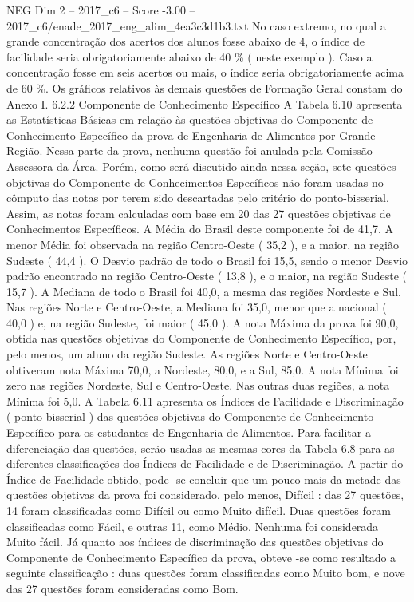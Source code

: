 \begin{textsample}{NEG Dim 2 – 2017\_c6 – Score -3.00 – 2017\_c6/enade\_2017\_eng\_alim\_4ea3c3d1b3.txt}
No caso extremo, no qual a grande concentração dos acertos dos alunos fosse abaixo de 4, o índice de facilidade seria obrigatoriamente abaixo de 40 \% ( neste exemplo ).
Caso a concentração fosse em seis acertos ou mais, o índice seria obrigatoriamente acima de 60 \%.
Os gráficos relativos às demais questões de Formação Geral constam do Anexo I. 6.2.2 Componente de Conhecimento Específico A Tabela 6.10 apresenta as Estatísticas Básicas em relação às questões objetivas do Componente de Conhecimento Específico da prova de Engenharia de Alimentos por Grande Região.
Nessa parte da prova, nenhuma questão foi anulada pela Comissão Assessora da Área.
Porém, como será discutido ainda nessa seção, sete questões objetivas do Componente de Conhecimentos Específicos não foram usadas no cômputo das notas por terem sido descartadas pelo critério do ponto-bisserial.
Assim, as notas foram calculadas com base em 20 das 27 questões objetivas de Conhecimentos Específicos.
A Média do Brasil deste componente foi de 41,7.
A menor Média foi observada na região Centro-Oeste ( 35,2 ), e a maior, na região Sudeste ( 44,4 ).
O Desvio padrão de todo o Brasil foi 15,5, sendo o menor Desvio padrão encontrado na região Centro-Oeste ( 13,8 ), e o maior, na região Sudeste ( 15,7 ).
A Mediana de todo o Brasil foi 40,0, a mesma das regiões Nordeste e Sul.
Nas regiões Norte e Centro-Oeste, a Mediana foi 35,0, menor que a nacional ( 40,0 ) e, na região Sudeste, foi maior ( 45,0 ).
A nota Máxima da prova foi 90,0, obtida nas questões objetivas do Componente de Conhecimento Específico, por, pelo menos, um aluno da região Sudeste.
As regiões Norte e Centro-Oeste obtiveram nota Máxima 70,0, a Nordeste, 80,0, e a Sul, 85,0.
A nota Mínima foi zero nas regiões Nordeste, Sul e Centro-Oeste.
Nas outras duas regiões, a nota Mínima foi 5,0.
A Tabela 6.11 apresenta os Índices de Facilidade e Discriminação ( ponto-bisserial ) das questões objetivas do Componente de Conhecimento Específico para os estudantes de Engenharia de Alimentos.
Para facilitar a diferenciação das questões, serão usadas as mesmas cores da Tabela 6.8 para as diferentes classificações dos Índices de Facilidade e de Discriminação.
A partir do Índice de Facilidade obtido, pode -se concluir que um pouco mais da metade das questões objetivas da prova foi considerado, pelo menos, Difícil : das 27 questões, 14 foram classificadas como Difícil ou como Muito difícil.
Duas questões foram classificadas como Fácil, e outras 11, como Médio.
Nenhuma foi considerada Muito fácil.
Já quanto aos índices de discriminação das questões objetivas do Componente de Conhecimento Específico da prova, obteve -se como resultado a seguinte classificação : duas questões foram classificadas como Muito bom, e nove das 27 questões foram consideradas como Bom.

\end{textsample}

